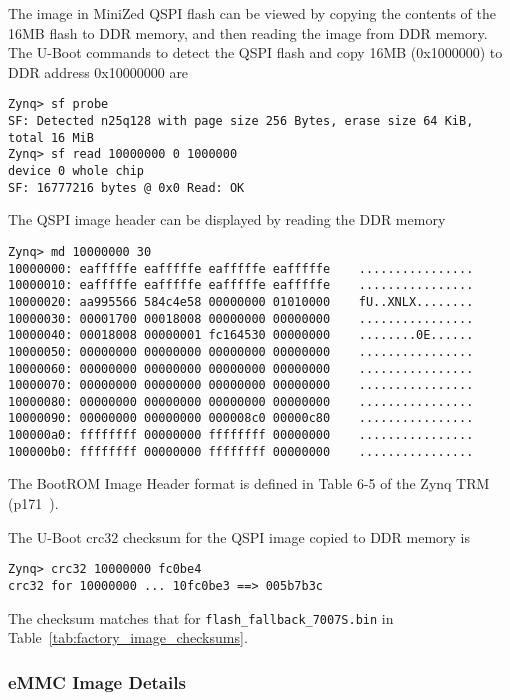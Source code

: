 The image in MiniZed QSPI flash can be viewed by copying the
contents of the 16MB flash to DDR memory, and then reading the
image from DDR memory. The U-Boot commands to detect the QSPI flash
and copy 16MB (0x1000000) to DDR address 0x10000000 are
%
\begin{verbatim}
Zynq> sf probe
SF: Detected n25q128 with page size 256 Bytes, erase size 64 KiB, total 16 MiB
Zynq> sf read 10000000 0 1000000
device 0 whole chip
SF: 16777216 bytes @ 0x0 Read: OK
\end{verbatim}
%
The QSPI image header can be displayed by reading the DDR memory
%
\begin{verbatim}
Zynq> md 10000000 30
10000000: eafffffe eafffffe eafffffe eafffffe    ................
10000010: eafffffe eafffffe eafffffe eafffffe    ................
10000020: aa995566 584c4e58 00000000 01010000    fU..XNLX........
10000030: 00001700 00018008 00000000 00000000    ................
10000040: 00018008 00000001 fc164530 00000000    ........0E......
10000050: 00000000 00000000 00000000 00000000    ................
10000060: 00000000 00000000 00000000 00000000    ................
10000070: 00000000 00000000 00000000 00000000    ................
10000080: 00000000 00000000 00000000 00000000    ................
10000090: 00000000 00000000 000008c0 00000c80    ................
100000a0: ffffffff 00000000 ffffffff 00000000    ................
100000b0: ffffffff 00000000 ffffffff 00000000    ................
\end{verbatim}
%
The BootROM Image Header format is defined in Table 6-5 of the Zynq
TRM (p171~\cite{Xilinx_UG585_2018}).

The U-Boot crc32 checksum for the QSPI image copied to DDR
memory is
%
\begin{verbatim}
Zynq> crc32 10000000 fc0be4
crc32 for 10000000 ... 10fc0be3 ==> 005b7b3c
\end{verbatim}
%
The checksum matches that for
\verb+flash_fallback_7007S.bin+
in Table~\ref{tab:factory_image_checksums}.

\clearpage
\subsubsection{eMMC Image Details}

